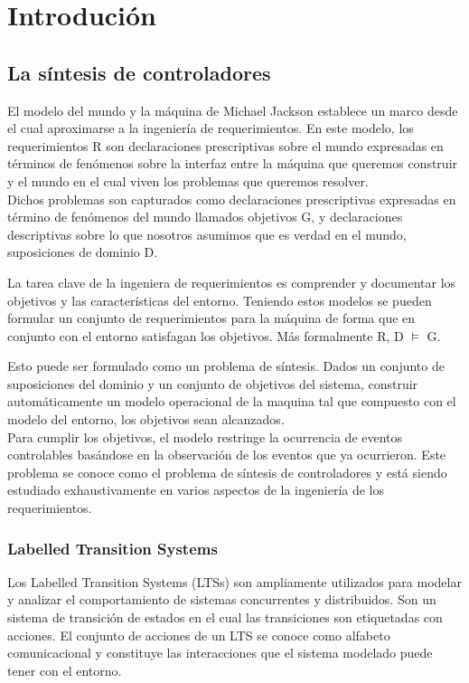 \chapter{Introdución}

\section{La síntesis de controladores}

El modelo del mundo y la máquina de Michael Jackson establece un marco desde el cual aproximarse a la ingeniería de requerimientos. En este modelo, los requerimientos R son declaraciones prescriptivas sobre el mundo expresadas en términos de fenómenos sobre la interfaz entre la máquina que queremos construir y el mundo en el cual viven los problemas que queremos resolver.\\
Dichos problemas son capturados como declaraciones prescriptivas expresadas en término de fenómenos del mundo llamados objetivos G, y declaraciones descriptivas sobre lo que nosotros asumimos que es verdad en el mundo, suposiciones de dominio D.

\vspace{\baselineskip}
La tarea clave de la ingeniera de requerimientos es comprender y documentar los objetivos y las características del entorno. Teniendo estos modelos se pueden formular un conjunto de requerimientos para la máquina de forma que en conjunto con el entorno satisfagan los objetivos. Más formalmente R, D $\vDash$ G.

\vspace{\baselineskip}
Esto puede ser formulado como un problema de síntesis. Dados un conjunto de suposiciones del dominio y un conjunto de objetivos del sistema, construir  automáticamente un modelo operacional de la maquina tal que compuesto con el modelo del entorno, los objetivos sean alcanzados.\\
Para cumplir los objetivos, el modelo restringe la ocurrencia de eventos controlables basándose en la observación de los eventos que ya ocurrieron.
Este problema se conoce como el problema de síntesis de controladores y está siendo estudiado exhaustivamente en varios aspectos de la ingeniería de los requerimientos.

\subsection{Labelled Transition Systems}
Los Labelled Transition Systems (LTSs) son ampliamente utilizados para modelar y analizar el comportamiento de sistemas concurrentes y distribuidos. Son un sistema de transición de estados en el cual las transiciones son etiquetadas con acciones. El conjunto de acciones de un LTS se conoce como alfabeto comunicacional y constituye las interacciones que el sistema modelado puede tener con el entorno.


